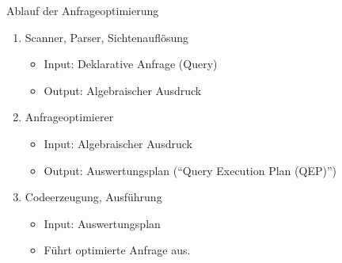 \begin{defi}{Ablauf der Anfrageoptimierung}
    \begin{enumerate}
        \item Scanner, Parser, Sichtenauflösung
              \begin{itemize}
                  \item Input: Deklarative Anfrage (Query)
                  \item Output: Algebraischer Ausdruck
              \end{itemize}
        \item Anfrageoptimierer
              \begin{itemize}
                  \item Input: Algebraischer Ausdruck
                  \item Output: Auswertungsplan (\enquote{Query Execution Plan (QEP)})
              \end{itemize}
        \item Codeerzeugung, Ausführung
              \begin{itemize}
                  \item Input: Auswertungsplan
                  \item Führt optimierte Anfrage aus.
              \end{itemize}
    \end{enumerate}
\end{defi}

